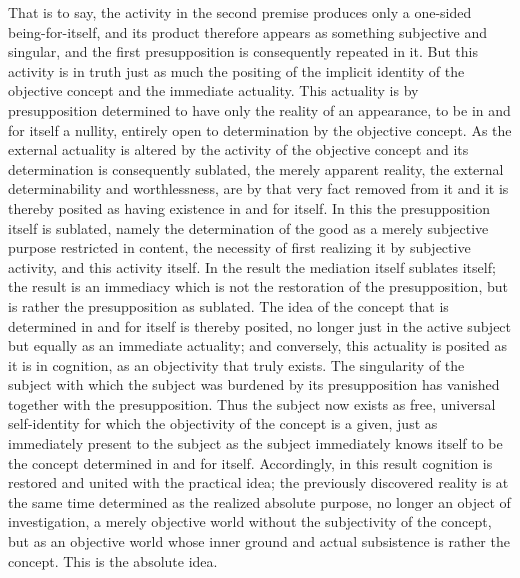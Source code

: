 That is to say, the activity in the second premise
produces only a one-sided being-for-itself,
and its product therefore appears as
something subjective and singular,
and the first presupposition is
consequently repeated in it.
But this activity is in truth just as much
the positing of the implicit identity
of the objective concept and the immediate actuality.
This actuality is by presupposition determined
to have only the reality of an appearance,
to be in and for itself a nullity,
entirely open to determination by the objective concept.
As the external actuality is altered by
the activity of the objective concept
and its determination is consequently sublated,
the merely apparent reality,
the external determinability and worthlessness,
are by that very fact removed from it
and it is thereby posited as having existence
in and for itself.
In this the presupposition itself is sublated,
namely the determination of the good as
a merely subjective purpose restricted in content,
the necessity of first realizing it
by subjective activity,
and this activity itself.
In the result the mediation itself sublates itself;
the result is an immediacy which is not
the restoration of the presupposition,
but is rather the presupposition as sublated.
The idea of the concept that is determined in
and for itself is thereby posited,
no longer just in the active subject but
equally as an immediate actuality;
and conversely, this actuality is posited
as it is in cognition,
as an objectivity that truly exists.
The singularity of the subject with which
the subject was burdened by its presupposition
has vanished together with the presupposition.
Thus the subject now exists
as free, universal self-identity
for which the objectivity of the concept is
a given, just as immediately present to the subject
as the subject immediately knows itself to be
the concept determined in and for itself.
Accordingly, in this result cognition is
restored and united with the practical idea;
the previously discovered reality is
at the same time determined as
the realized absolute purpose,
no longer an object of investigation,
a merely objective world without
the subjectivity of the concept,
but as an objective world whose inner ground
and actual subsistence is rather the concept.
This is the absolute idea.
